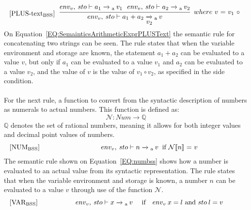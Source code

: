 \begin{equation}\label{EQ:SemainticsArithmeticExprPLUSText}
\begin{minipage}{.2\linewidth}
$[\text{PLUS-text}_\text{BSS}]$
\end{minipage}
\begin{minipage}{.8\linewidth}
\centering
$\cfrac{env_v, \: sto \vdash a_1 \xrightarrow{}\textsubscript{a} \: v_1 \: \: \: env_v, \: sto \vdash a_2 \xrightarrow{}\textsubscript{a} \: v_2}{env_v, \: sto \vdash a_1 + a_2 \xrightarrow{}\textsubscript{a} \: v}$
$ \: where$ $v$ $=$ $v_1$ $\circ$ $v_2$
\end{minipage}
\end{equation}
On Equation~\ref{EQ:SemainticsArithmeticExprPLUSText} the semantic rule for concatenating two strings can be seen. The rule states that when the variable environment and storage are known, the statement $a_1 + a_2$ can be evaluated to a value $v$, but only if $a_1$ can be evaluated to a value $v_1$ and $a_2$ can be evaluated to a value $v_2$, and the value of $v$ is the value of $v_1 \circ v_2$, as specified in the side condition.
\\\\
For the next rule, a function to convert from the syntactic description of numbers as numerals to actual numbers. This function is defined as:
\begin{equation*}
    \mathcal{N}: Num \xrightarrow{} \mathbb{Q}
\end{equation*}
$\mathbb{Q}$ denotes the set of rational numbers, meaning it allows for both integer values and decimal point values of numbers.
\begin{equation}\label{EQ:numbss}
\begin{minipage}{.2\linewidth}
$[\text{NUM}_\text{BSS}]$
\end{minipage}
\begin{minipage}{.8\linewidth}
\centering
$env_v, \: sto \vdash n \xrightarrow{}\textsubscript{a} \: v$ $ \: \text{if}$ $\mathcal{N}[\![n]\!]$ $=$ $v$ 
\end{minipage}
\end{equation}
The semantic rule shown on Equation~\ref{EQ:numbss} shows how a number is evaluated to an actual value from its syntactic representation. The rule states that when the variable environment and storage is known, a number $n$ can be evaluated to a value $v$ through use of the function $\mathcal{N}$.
\\
\begin{equation}\label{EQ:SemainticsArithmeticExprVAR}
\begin{minipage}{.2\linewidth}
$[\text{VAR}_\text{BSS}]$
\end{minipage}
\begin{minipage}{.8\linewidth}
\centering
$env_v, \: sto \vdash x \xrightarrow{}\textsubscript{a} \: v$ $ \quad \text{if} \quad env_v \: x = l$ and $sto \: l = v$ 
\end{minipage}
\end{equation}
